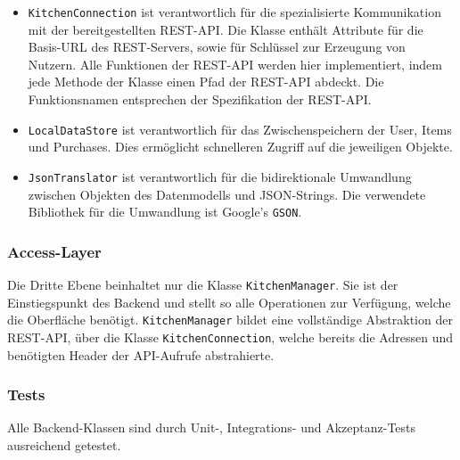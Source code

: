 \begin{itemize}
	\item  \texttt{KitchenConnection} ist verantwortlich für die spezialisierte Kommunikation mit der bereitgestellten REST-API. Die Klasse enthält Attribute für die Basis-URL des REST-Servers, sowie für Schlüssel zur Erzeugung von Nutzern.
	Alle Funktionen der REST-API werden hier implementiert, indem jede Methode der Klasse einen Pfad der REST-API abdeckt.
	Die Funktionsnamen entsprechen der Spezifikation der REST-API\@.

	\item \texttt{LocalDataStore} ist verantwortlich für das Zwischenspeichern der User, Items und Purchases.
	Dies ermöglicht schnelleren Zugriff auf die jeweiligen Objekte.

	\item \texttt{JsonTranslator} ist verantwortlich für die bidirektionale Umwandlung zwischen Objekten des Datenmodells und JSON-Strings.
	Die verwendete Bibliothek für die Umwandlung ist Google's \texttt{GSON}.
\end{itemize}

\subsubsection{Access-Layer}

Die Dritte Ebene beinhaltet nur die Klasse \texttt{KitchenManager}.
Sie ist der Einstiegspunkt des Backend und stellt so alle Operationen zur Verfügung, welche die Oberfläche benötigt. \texttt{KitchenManager} bildet eine vollständige Abstraktion der REST-API, über die Klasse \texttt{KitchenConnection}, welche bereits die Adressen und benötigten Header der API-Aufrufe abstrahierte.


\subsubsection{Tests}

Alle Backend-Klassen sind durch Unit-, Integrations- und Akzeptanz-Tests ausreichend getestet.
